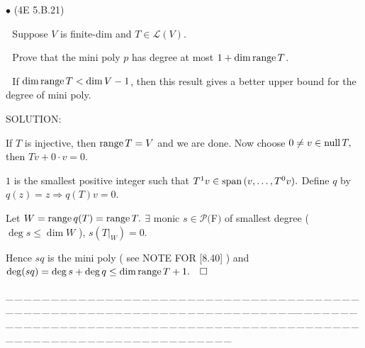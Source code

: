 \documentclass[a4paper, 11pt, UTF8]{article}
\def\range{\textup{range}\,}
\def\null{\textup{null\,}}
\def\Spn{\textup{span}\,}
\def\Lm{\mathcal{L}}
\def\Po{\mathcal{P}}
\begin{document}
\begin{large}
{\small $\bullet$} ({\normalsize 4E 5.B.21})\par\,\, {\timessl\Large 
Suppose $V$ is finite-dim and $T\in \Lm(V)$.}\par\,\,
{\timessl\Large Prove that the mini poly $p$ has degree at most $1 + \dim \range T$.}\par\,\,
{\timessl\normalsize
If $\dim \range T < \dim V - 1$, then this result gives a better upper bound for the degree of mini poly.
}{\small\par}
{\timesbf S\footnotesize{OLUTION:}}{\small\par}\quad
If $T$ is injective, then $\range T=V$ and we are done. Now choose $0\neq v\in\null T,$ then $Tv+0\cdot v=0.$\par\quad
$1$ is the smallest positive integer such that $T^1 v\in\Spn(v,\dots,T^0 v).$ Define $q$ by $q(z)=z\Rightarrow q(T)v=0.$\par\quad
Let $W=\range q(T)=\range T.$ $\exists$ monic $s\in\Po(${\timesbf F}$)$ of smallest degree ( $\deg s\leq\dim W$ ), $s(T|_W)=0.$\par\quad
Hence $sq$ is the mini poly ( see N{\small OTE} F{\small OR} [8.40] ) and $\deg(sq)=\deg s+\deg q\leq\dim\range T+1.\quad\square$\par
{\tiny \_\,\_\,\_\,\_\,\_\,\_\,\_\,\_\,\_\,\_\,\_\,\_\,\_\,\_\,\_\,\_\,\_\,\_\,\_\,\_\,\_\,\_\,\_\,\_\,\_\,\_\,\_\,\_\,\_\,\_\,\_\,\_\,\_\,\_\,\_\,\_\,\_\,\_\,\_\,\_\,\_\,\_\,\_\,\_\,\_\,\_\,\_\,\_\,\_\,\_\,\_\,\_\,\_\,\_\,\_\,\_\,\_\,\_\,\_\,\_\,\_\,\_\,\_\,\_\,\_\,\_\,\_\,\_\,\_\,\_\,\_\_\,\_\,\_\,\_\,\_\,\_\,\_\,\_\,\_\,\_\,\_\,\_\,\_\,\_\,\_\,\_\,\_\,\_\,\_\,\_\,\_\,\_\,\_\,\_\,\_\,\_\,\_\,\_\,\_\,\_\,\_\,\_\,\_\,\_\,\_\,\_\,\_\,\_\,\_\,\_\,\_\,\_\,\_\,\_\,\_\,\_\,\_\,\_\,\_\,\_\,\_\,\_\,\_\,\_\,\_\,\_\,\_\,\_\,\_\,\_\,\_\,\_\,\_\,\_\,\_\,\_\,\_\,\_\,\_\,\_\,\_}\par


\end{large}
\end{document}
